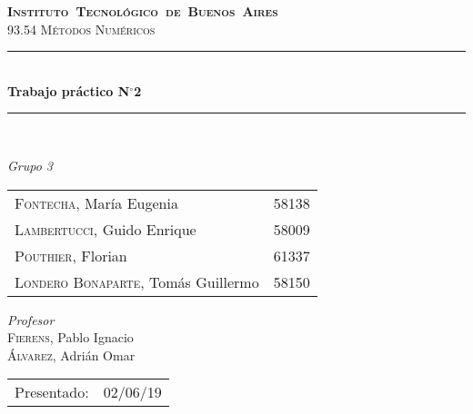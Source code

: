 \begin{titlepage}
\newcommand{\HRule}{\rule{\linewidth}{0.5mm}}
\center
\mbox{\textsc{\LARGE \bfseries {Instituto Tecnológico de Buenos Aires}}}\\[1.5cm]
\textsc{\Large 93.54 Métodos Numéricos}\\[0.5cm]


\HRule \\[0.6cm]
{ \Huge \bfseries Trabajo práctico N$^{\circ}$2}\\[0.4cm] 
\HRule \\[1.5cm]


{\large

\emph{Grupo 3}\\
\vspace{3px}

\begin{tabular}{lr} 	
\textsc{Fontecha}, María Eugenia  & 58138 \\
\textsc{Lambertucci}, Guido Enrique  & 58009 \\
\textsc{Pouthier}, Florian  & 61337 \\
\textsc{Londero Bonaparte}, Tomás Guillermo  & 58150 \\
\end{tabular}

\vspace{20px}

\emph{Profesor}\\
\vspace{3px}
\textsc{Fierens}, Pablo Ignacio\\ 	
\textsc{Álvarez}, Adrián Omar\\ 

\vspace{100px}

\begin{tabular}{ll}

Presentado: & 02/06/19\\

\end{tabular}

}

\vfill

\end{titlepage}
